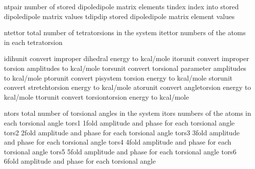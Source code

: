 \documentclass[letterpaper,11pt,english]{sphinxmanual}
\begin{document}
\begin{sphinxVerbatim}[commandchars=\\\{\}]
ntpair          number of stored dipole\PYGZhy{}dipole matrix elements
tindex          index into stored dipole\PYGZhy{}dipole matrix values
tdipdip         stored dipole\PYGZhy{}dipole matrix element values
\end{sphinxVerbatim}

\sphinxAtStartPar
{}

\begin{sphinxVerbatim}[commandchars=\\\{\}]
ntettor         total number of tetratorsions in the system
itettor         numbers of the atoms in each tetratorsion
\end{sphinxVerbatim}

\sphinxAtStartPar
{}

\begin{sphinxVerbatim}[commandchars=\\\{\}]
idihunit        convert improper dihedral energy to kcal/mole
itorunit        convert improper torsion amplitudes to kcal/mole
torsunit        convert torsional parameter amplitudes to kcal/mole
ptorunit        convert pi\PYGZhy{}system torsion energy to kcal/mole
storunit        convert stretch\PYGZhy{}torsion energy to kcal/mole
atorunit        convert angle\PYGZhy{}torsion energy to kcal/mole
ttorunit        convert torsion\PYGZhy{}torsion energy to kcal/mole
\end{sphinxVerbatim}

\sphinxAtStartPar
{}

\begin{sphinxVerbatim}[commandchars=\\\{\}]
ntors           total number of torsional angles in the system
itors           numbers of the atoms in each torsional angle
tors1           1\PYGZhy{}fold amplitude and phase for each torsional angle
tors2           2\PYGZhy{}fold amplitude and phase for each torsional angle
tors3           3\PYGZhy{}fold amplitude and phase for each torsional angle
tors4           4\PYGZhy{}fold amplitude and phase for each torsional angle
tors5           5\PYGZhy{}fold amplitude and phase for each torsional angle
tors6           6\PYGZhy{}fold amplitude and phase for each torsional angle
\end{sphinxVerbatim}
\end{document}
